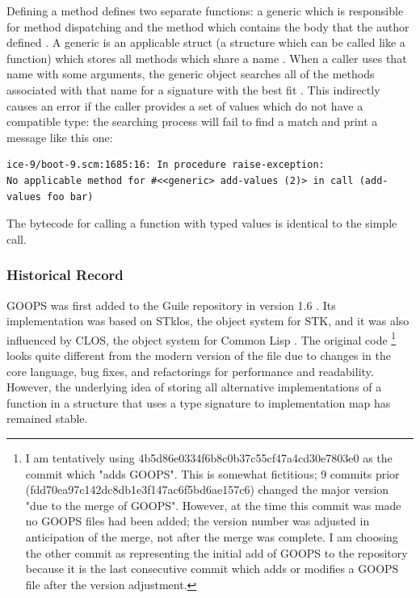 Defining a method defines two separate functions: a generic which is responsible for
method dispatching and the method which contains the body that the author defined
\parencite[][Section 8.6 "Methods and Generic Functons"]{guile-manual}.
A generic is an applicable struct (a structure which can be called like a function) which
stores all methods which share a name
\parencite[][module/oop/goops.scm lines 2045-2245]{guile-source}.
When a caller uses that name with some arguments, the generic object searches all of the
methods associated with that name for a signature with the best fit
\parencite[][module/oop/goops.scm lines 1381-1449]{guile-source}.
This indirectly causes an error if the caller provides a set of values which do not have a
compatible type: the searching process will fail to find a match and print a message like
this one:

\begin{verbatim}
ice-9/boot-9.scm:1685:16: In procedure raise-exception:
No applicable method for #<<generic> add-values (2)> in call (add-values foo bar)
\end{verbatim}

The bytecode for calling a function with typed values is identical to the simple call.

\subsubsection{Historical Record}
GOOPS was first added to the Guile repository in version 1.6
\parencite[][Section 9.1.4 "A Timeline of Selected Guile Releases"]{guile-manual}.
Its implementation was based on STklos, the object system for STK, and it was also
influenced by CLOS, the object system for Common Lisp
\parencite[][module/oop/goops.scm lines 24-25]{guile-source}
\parencite[][Section 8.0 "GOOPS"]{guile-manual}.
The original code
\footnote{
	I am tentatively using 4b5d86e0334f6b8c0b37c55cf47a4cd30e7803e0 as the commit which 
	"adds GOOPS".
	This is somewhat fictitious; 9 commits prior (fdd70ea97c142dc8db1e3f147ac6f5bd6ae157c6)
	changed the major version "due to the merge of GOOPS".
	However, at the time this commit was made no GOOPS files had been added; the version
	number was adjusted in anticipation of the merge, not after the merge was complete.
	I am choosing the other commit as representing the initial add of GOOPS to the
	repository because it is the last consecutive commit which adds or modifies a GOOPS file
	after the version adjustment.
}
looks quite different from the modern version of the file due to changes in the core
language, bug fixes, and refactorings for performance and readability.
However, the underlying idea of storing all alternative implementations of a function in a
structure that uses a type signature to implementation map has remained stable.

